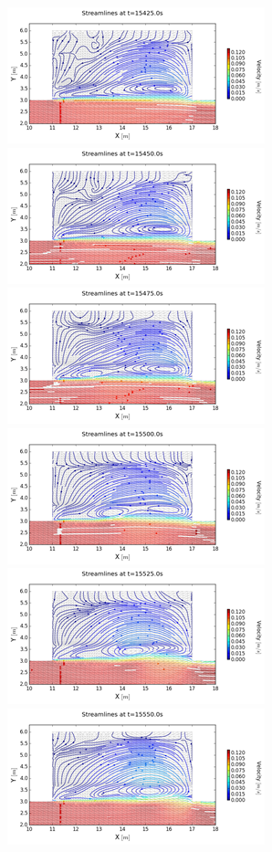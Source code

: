 \begin{figure}
 \centering
\includegraphics{img/image128}
\includegraphics{img/image129}
\includegraphics{img/image130}
\includegraphics{img/image131}
\includegraphics{img/image132}
\includegraphics{img/image133}

\end{figure}
